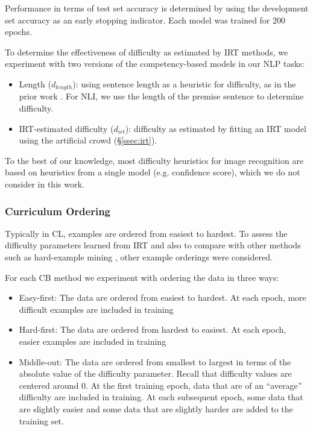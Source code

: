 \documentclass[letterpaper]{article} %
\begin{document}
Performance in terms of test set accuracy is determined by using the development set accuracy as an early stopping indicator.
Each model was trained for 200 epochs. 

To determine the effectiveness of difficulty as estimated by IRT methods, we experiment with two versions of the competency-based models in our NLP tasks:

\begin{itemize}
	\item 
	Length ($d_{length}$): using sentence length as a heuristic for difficulty, as in the prior work \cite{platanios_competence-based_2019}. For NLI, we use the length of the premise sentence to determine difficulty.
	\item 
	IRT-estimated difficulty ($d_{irt}$): difficulty as estimated by fitting an IRT model using the artificial crowd (\S \ref{ssec:irt}). 
\end{itemize}

To the best of our knowledge, most difficulty heuristics for image recognition are based on heuristics from a single model (e.g. confidence score), which we do not consider in this work. 

\subsubsection{Curriculum Ordering}

Typically in CL, examples are ordered from easiest to hardest.
To assess the difficulty parameters learned from IRT and also to compare with other methods such as hard-example mining \cite{shrivastava_training_2016}, other example orderings were considered.

For each CB method we experiment with ordering the data in three ways:
\begin{itemize}
	\item 
	Easy-first: The data are ordered from easiest to hardest. At each epoch, more difficult examples are included in training
	\item 
	Hard-first: The data are ordered from hardest to easiest. At each epoch, easier examples are included in training
	\item 
	Middle-out: The data are ordered from smallest to largest in terms of the absolute value of the difficulty parameter. Recall that difficulty values are centered around $0$. At the first training epoch, data that are of an ``average'' difficulty are included in training. At each subsequent epoch, some data that are slightly easier and some data that are slightly harder are added to the training set.
\end{itemize}
\end{document}
